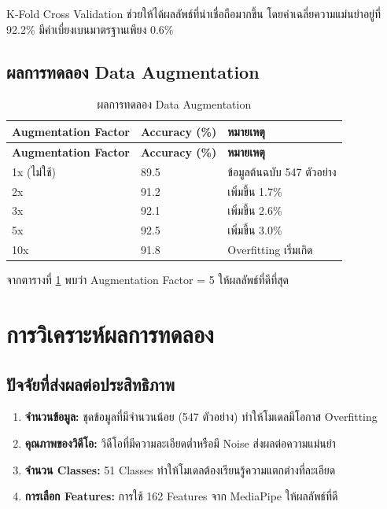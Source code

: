 \documentclass[12pt,a4paper]{report}
\begin{document}
K-Fold Cross Validation ช่วยให้ได้ผลลัพธ์ที่น่าเชื่อถือมากขึ้น 
โดยค่าเฉลี่ยความแม่นยำอยู่ที่ 92.2\% มีค่าเบี่ยงเบนมาตรฐานเพียง 0.6\%

\subsection{ผลการทดลอง Data Augmentation}

\begin{longtable}{|p{4cm}|p{4cm}|p{4cm}|}
\caption{ผลการทดลอง Data Augmentation}
\label{tab:augmentation} \\
\hline
\textbf{Augmentation Factor} & \textbf{Accuracy (\%)} & \textbf{หมายเหตุ} \\
\hline
\endfirsthead
\hline
\textbf{Augmentation Factor} & \textbf{Accuracy (\%)} & \textbf{หมายเหตุ} \\
\hline
\endhead
\hline
1x (ไม่ใช้) & 89.5 & ข้อมูลต้นฉบับ 547 ตัวอย่าง \\
\hline
2x & 91.2 & เพิ่มขึ้น 1.7\% \\
\hline
3x & 92.1 & เพิ่มขึ้น 2.6\% \\
\hline
5x & 92.5 & เพิ่มขึ้น 3.0\% \\
\hline
10x & 91.8 & Overfitting เริ่มเกิด \\
\hline
\end{longtable}

จากตารางที่ \ref{tab:augmentation} พบว่า Augmentation Factor = 5 ให้ผลลัพธ์ที่ดีที่สุด

\section{การวิเคราะห์ผลการทดลอง}

\subsection{ปัจจัยที่ส่งผลต่อประสิทธิภาพ}

\begin{enumerate}
    \item \textbf{จำนวนข้อมูล:} ชุดข้อมูลที่มีจำนวนน้อย (547 ตัวอย่าง) ทำให้โมเดลมีโอกาส Overfitting
    \item \textbf{คุณภาพของวิดีโอ:} วิดีโอที่มีความละเอียดต่ำหรือมี Noise ส่งผลต่อความแม่นยำ
    \item \textbf{จำนวน Classes:} 51 Classes ทำให้โมเดลต้องเรียนรู้ความแตกต่างที่ละเอียด
    \item \textbf{การเลือก Features:} การใช้ 162 Features จาก MediaPipe ให้ผลลัพธ์ที่ดี
\end{enumerate}
\end{document}
